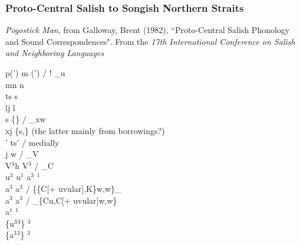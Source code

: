 \documentclass[11pt]{article}
\begin{document}
\subsubsection{Proto-Central Salish to Songish Northern Straits}\textit{Pogostick Man}, from Galloway, Brent (1982), \textquotedblleft Proto-Central Salish Phonology and Sound Correspondences". From the \textit{17th International Conference on Salish and Neighboring Languages}

p(') m \textrightarrow\hspace{0pt} (')  / ! _u \\
mn \textrightarrow\hspace{0pt} n \\
ts \textrightarrow\hspace{0pt} s \\
l\super j \textrightarrow\hspace{0pt} l \\
s \textrightarrow\hspace{0pt} \{\} / _x\super w \\
x\super j \textrightarrow\hspace{0pt} \{s,\} (the latter mainly from borrowings?) \\
' \textrightarrow\hspace{0pt} ts' / medially \\
j w \textrightarrow\hspace{0pt}  / _V \\
V$^3$h \textrightarrow\hspace{0pt} V$^3$\textipa{:} / _C \\
u$^3$ u$^1$ \textrightarrow\hspace{0pt} a$^3$ $^1$ \\
a$^3$ \textrightarrow\hspace{0pt} a$^3$ / \{\{C[+ uvular],K\}\super w,w\}_ \\
a$^3$ \textrightarrow\hspace{0pt} a$^3$ / _\{Cu,C[+ uvular]\super w,w\} \\
a$^1$ \textrightarrow\hspace{0pt} $^1$ \\
\{u$^3$\raisebox{-0.7ex}{\textasciitilde}$^3$\} \textrightarrow\hspace{0pt} $^3$ \\
\{a$^3$\raisebox{-0.7ex}{\textasciitilde}$^3$\} \textrightarrow\hspace{0pt} $^3$ \\
\end{document}
